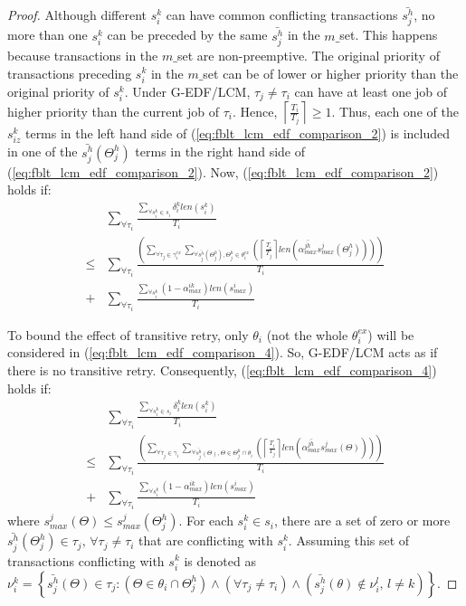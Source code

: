 \documentclass[a4paper,english]{article}
\newtheorem{proof}{Proof}
\begin{document}
\begin{proof}
Although different $s_{i}^{k}$ can have common conflicting transactions
$\bar{s_{j}^{h}}$, no more than one $s_{i}^{k}$ can be preceded
by the same $\bar{s_{j}^{h}}$ in the $m\_$set. This happens because
transactions in the $m\_$set are non-preemptive. The original priority
of transactions preceding $s_{i}^{k}$ in the $m\_$set can be of
lower or higher priority than the original priority of $s_{i}^{k}$. Under
G-EDF/LCM, $\tau_{j}\ne\tau_{i}$ can have at least one job of higher
priority than the current job of $\tau_{i}$. Hence, $\left\lceil \frac{T_{i}}{T_{j}}\right\rceil \ge1$.
Thus, each one of the $s_{iz}^{k}$ terms in the left hand side of (\ref{eq:fblt_lcm_edf_comparison_2}) is included in one of the $\bar{s_{j}^{h}}(\Theta_j^h)$ terms in the right hand side of (\ref{eq:fblt_lcm_edf_comparison_2}). Now, (\ref{eq:fblt_lcm_edf_comparison_2}) holds if: 
\begin{eqnarray}
 & \sum_{\forall\tau_{i}}\frac{\sum_{\forall s_{i}^{k}\in s_{i}}\delta_i^klen(s_{i}^{k})}{T_{i}}\label{eq:fblt_lcm_edf_comparison_4}\\
\le & \sum_{\forall\tau_{i}}\frac{\left(\sum_{\forall\tau_{j}\in\gamma_{i}^{ex}}\sum_{\forall\bar{s_{j}^{h}}(\Theta_j^h),\Theta_j^h\in\theta_{i}^{ex}}\left(\left\lceil \frac{T_{i}}{T_{j}}\right\rceil len\left(\bar{\alpha_{max}^{jh}}s_{max}^{j}(\Theta_j^h)\right)\right)\right)}{T_{i}}\nonumber \\
+ & \sum_{\forall\tau_{i}}\frac{\sum_{\forall s_{i}^{k}}\left(1-\alpha_{max}^{ik}\right)len\left(s_{max}^{i}\right)}{T_{i}}\nonumber 
\end{eqnarray}

To bound the effect of transitive retry, only $\theta_i$ (not the whole $\theta_i^{ex}$) will be considered in (\ref{eq:fblt_lcm_edf_comparison_4}). So, G-EDF/LCM acts as if there is no transitive retry. Consequently, (\ref{eq:fblt_lcm_edf_comparison_4}) holds if: 
\begin{eqnarray}
 & \sum_{\forall\tau_{i}}\frac{\sum_{\forall s_{i}^{k}\in s_{i}}\delta_i^k len(s_{i}^{k})}{T_{i}}\label{eq:fblt_lcm_edf_comparison_4_1}\\
\le & \sum_{\forall\tau_{i}}\frac{\left(\sum_{\forall\tau_{j}\in\gamma_{i}}\sum_{\forall\bar{s_{j}^{h}}(\Theta),\Theta \in \Theta_j^h \cap \theta_{i}}\left(\left\lceil \frac{T_{i}}{T_{j}}\right\rceil len\left(\bar{\alpha_{max}^{jh}}s_{max}^{j}(\Theta)\right)\right)\right)}{T_{i}}\nonumber \\
+ & \sum_{\forall\tau_{i}}\frac{\sum_{\forall s_{i}^{k}}\left(1-\alpha_{max}^{ik}\right)len\left(s_{max}^{i}\right)}{T_{i}}\nonumber 
\end{eqnarray}
where $s_{max}^j(\Theta) \le s_{max}^j(\Theta_j^h)$. 
For each $s_{i}^{k}\in s_{i}$, there are a set of zero or more $\bar{s_{j}^{h}}(\Theta_j^h)\in\tau_{j},\,\forall\tau_{j}\ne\tau_{i}$
that are conflicting with $s_{i}^{k}$. Assuming this set of transactions conflicting with $s_{i}^{k}$ is denoted as $\nu_{i}^{k}=\left\{ \bar{s_{j}^{h}}(\Theta)\in\tau_{j}:\left(\Theta\in\theta_{i} \cap \Theta_j^h \right) \wedge \left(\forall\tau_{j}\ne\tau_{i}\right) \wedge \left(\bar{s_{j}^{h}}(\theta)\not\in\nu_{i}^{l},\, l\ne k\right)\right\} $.



\end{proof}
\end{document}
